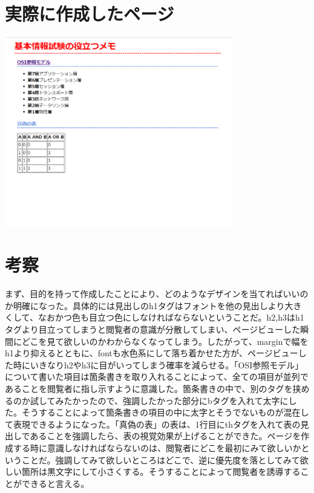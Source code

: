\documentclass[12pt,a4j]{jarticle}
\begin{document}
\section{実際に作成したページ}

\begin{center}
  \includegraphics[width=10cm]{./index.png}
\end{center}

\section{考察}

まず、目的を持って作成したことにより、どのようなデザインを当てればいいのか明確になった。具体的には見出しのh1タグはフォントを他の見出しより大きくして、なおかつ色も目立つ色にしなければならないということだ。h2,h3はh1タグより目立ってしまうと閲覧者の意識が分散してしまい、ページビューした瞬間にどこを見て欲しいのかわからなくなってしまう。したがって、marginで幅をh1より抑えるとともに、fontも水色系にして落ち着かせた方が、ページビューした時にいきなりh2やh3に目がいってしまう確率を減らせる。「OSI参照モデル」について書いた項目は箇条書きを取り入れることによって、全ての項目が並列であることを閲覧者に指し示すように意識した。箇条書きの中で、別のタグを挟めるのか試してみたかったので、強調したかった部分にbタグを入れて太字にした。そうすることによって箇条書きの項目の中に太字とそうでないものが混在して表現できるようになった。「真偽の表」の表は、1行目にthタグを入れて表の見出しであることを強調したら、表の視覚効果が上げることができた。ページを作成する時に意識しなければならないのは、閲覧者にどこを最初にみて欲しいかということだ。強調してみて欲しいところはどこで、逆に優先度を落としてみて欲しい箇所は黒文字にして小さくする。そうすることによって閲覧者を誘導することができると言える。
\end{document}
